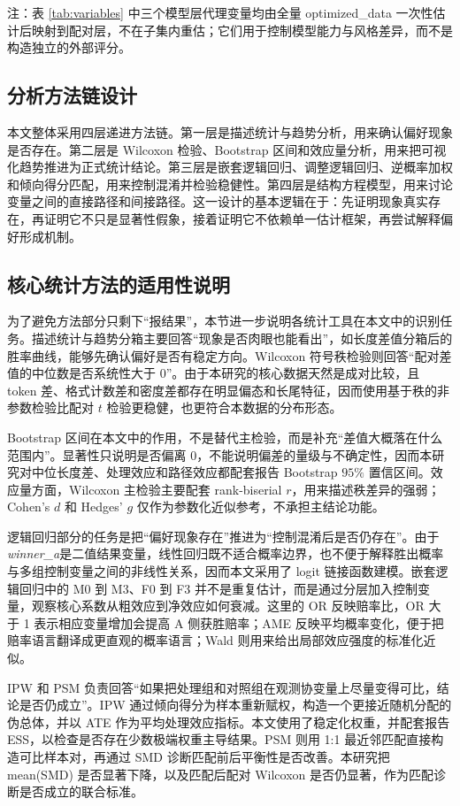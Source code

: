 \documentclass[9pt,a4paper,fontset=windows]{ctexart}
\theoremstyle{definition}
\numberwithin{equation}{section}
\newcommand{\winner}{\textit{winner\_a}}
\begin{document}
注：表 \ref{tab:variables} 中三个模型层代理变量均由全量 optimized\_data 一次性估计后映射到配对层，不在子集内重估；它们用于控制模型能力与风格差异，而不是构造独立的外部评分。

\subsection{分析方法链设计}
本文整体采用四层递进方法链。第一层是描述统计与趋势分析，用来确认偏好现象是否存在。第二层是 Wilcoxon 检验、Bootstrap 区间和效应量分析，用来把可视化趋势推进为正式统计结论。第三层是嵌套逻辑回归、调整逻辑回归、逆概率加权和倾向得分匹配，用来控制混淆并检验稳健性。第四层是结构方程模型，用来讨论变量之间的直接路径和间接路径。这一设计的基本逻辑在于：先证明现象真实存在，再证明它不只是显著性假象，接着证明它不依赖单一估计框架，再尝试解释偏好形成机制。

\subsection{核心统计方法的适用性说明}
为了避免方法部分只剩下“报结果”，本节进一步说明各统计工具在本文中的识别任务。描述统计与趋势分箱主要回答“现象是否肉眼也能看出”，如长度差值分箱后的胜率曲线，能够先确认偏好是否有稳定方向。Wilcoxon 符号秩检验则回答“配对差值的中位数是否系统性大于 0”。由于本研究的核心数据天然是成对比较，且 token 差、格式计数差和密度差都存在明显偏态和长尾特征，因而使用基于秩的非参数检验比配对 \(t\) 检验更稳健，也更符合本数据的分布形态。

Bootstrap 区间在本文中的作用，不是替代主检验，而是补充“差值大概落在什么范围内”。显著性只说明是否偏离 0，不能说明偏差的量级与不确定性，因而本研究对中位长度差、处理效应和路径效应都配套报告 Bootstrap \(95\%\) 置信区间。效应量方面，Wilcoxon 主检验主要配套 rank-biserial \(r\)，用来描述秩差异的强弱；Cohen's \(d\) 和 Hedges' \(g\) 仅作为参数化近似参考，不承担主结论功能。

逻辑回归部分的任务是把“偏好现象存在”推进为“控制混淆后是否仍存在”。由于 \winner 是二值结果变量，线性回归既不适合概率边界，也不便于解释胜出概率与多组控制变量之间的非线性关系，因而本文采用了 logit 链接函数建模。嵌套逻辑回归中的 M0 到 M3、F0 到 F3 并不是重复估计，而是通过分层加入控制变量，观察核心系数从粗效应到净效应如何衰减。这里的 OR 反映赔率比，OR 大于 1 表示相应变量增加会提高 A 侧获胜赔率；AME 反映平均概率变化，便于把赔率语言翻译成更直观的概率语言；Wald 则用来给出局部效应强度的标准化近似。

IPW 和 PSM 负责回答“如果把处理组和对照组在观测协变量上尽量变得可比，结论是否仍成立”。IPW 通过倾向得分为样本重新赋权，构造一个更接近随机分配的伪总体，并以 ATE 作为平均处理效应指标。本文使用了稳定化权重，并配套报告 ESS，以检查是否存在少数极端权重主导结果。PSM 则用 1:1 最近邻匹配直接构造可比样本对，再通过 SMD 诊断匹配前后平衡性是否改善。本研究把 mean(SMD) 是否显著下降，以及匹配后配对 Wilcoxon 是否仍显著，作为匹配诊断是否成立的联合标准。
\end{document}
